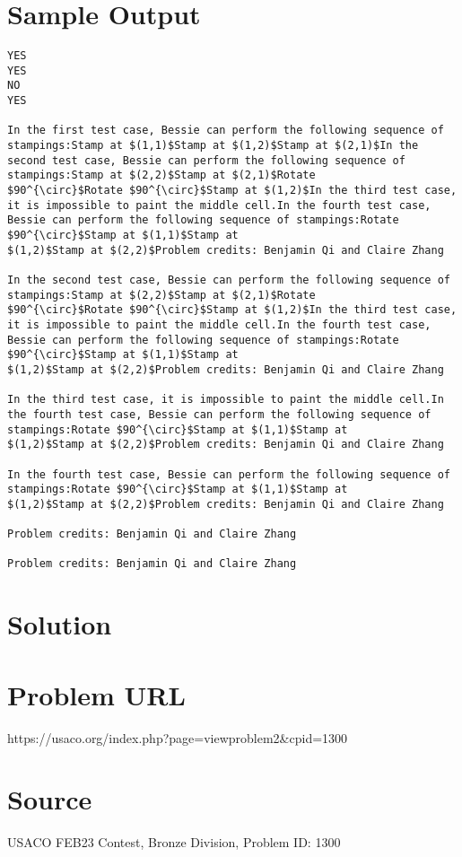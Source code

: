 \documentclass[12pt]{article}
\begin{document}
\section*{Sample Output}
\begin{verbatim}
YES
YES
NO
YES

In the first test case, Bessie can perform the following sequence of stampings:Stamp at $(1,1)$Stamp at $(1,2)$Stamp at $(2,1)$In the second test case, Bessie can perform the following sequence of stampings:Stamp at $(2,2)$Stamp at $(2,1)$Rotate
$90^{\circ}$Rotate $90^{\circ}$Stamp at $(1,2)$In the third test case, it is impossible to paint the middle cell.In the fourth test case, Bessie can perform the following sequence of stampings:Rotate $90^{\circ}$Stamp at $(1,1)$Stamp at
$(1,2)$Stamp at $(2,2)$Problem credits: Benjamin Qi and Claire Zhang

In the second test case, Bessie can perform the following sequence of stampings:Stamp at $(2,2)$Stamp at $(2,1)$Rotate
$90^{\circ}$Rotate $90^{\circ}$Stamp at $(1,2)$In the third test case, it is impossible to paint the middle cell.In the fourth test case, Bessie can perform the following sequence of stampings:Rotate $90^{\circ}$Stamp at $(1,1)$Stamp at
$(1,2)$Stamp at $(2,2)$Problem credits: Benjamin Qi and Claire Zhang

In the third test case, it is impossible to paint the middle cell.In the fourth test case, Bessie can perform the following sequence of stampings:Rotate $90^{\circ}$Stamp at $(1,1)$Stamp at
$(1,2)$Stamp at $(2,2)$Problem credits: Benjamin Qi and Claire Zhang

In the fourth test case, Bessie can perform the following sequence of stampings:Rotate $90^{\circ}$Stamp at $(1,1)$Stamp at
$(1,2)$Stamp at $(2,2)$Problem credits: Benjamin Qi and Claire Zhang

Problem credits: Benjamin Qi and Claire Zhang

Problem credits: Benjamin Qi and Claire Zhang
\end{verbatim}

\section*{Solution}


\section*{Problem URL}
https://usaco.org/index.php?page=viewproblem2&cpid=1300

\section*{Source}
USACO FEB23 Contest, Bronze Division, Problem ID: 1300
\end{document}

